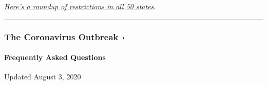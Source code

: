 \href{https://www.nytimes.com/interactive/2020/us/states-reopen-map-coronavirus.html}{\emph{Here's
a roundup of restrictions in all 50 states}}\emph{.}

\begin{center}\rule{0.5\linewidth}{\linethickness}\end{center}

\href{https://www.nytimes.com/news-event/coronavirus?action=click\&pgtype=Article\&state=default\&region=MAIN_CONTENT_3\&context=storylines_faq}{}

\hypertarget{the-coronavirus-outbreak-}{%
\subsubsection{The Coronavirus Outbreak
›}\label{the-coronavirus-outbreak-}}

\hypertarget{frequently-asked-questions}{%
\paragraph{Frequently Asked
Questions}\label{frequently-asked-questions}}

Updated August 3, 2020

